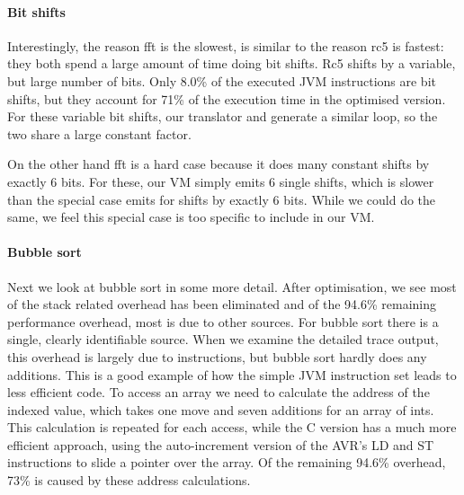 \paragraph{Bit shifts} Interestingly, the reason fft is the slowest, is similar to the reason rc5 is fastest: they both spend a large amount of time doing bit shifts. Rc5 shifts by a variable, but large number of bits. Only 8.0\% of the executed JVM instructions are bit shifts, but they account for 71\% of the execution time in the optimised version. For these variable bit shifts, our translator and  generate a similar loop, so the two share a large constant factor.

On the other hand fft is a hard case because it does many constant shifts by exactly 6 bits. For these, our VM simply emits 6 single shifts, which is slower than the special case  emits for shifts by exactly 6 bits.  While we could do the same, we feel this special case is too specific to include in our VM.

\paragraph{Bubble sort} Next we look at bubble sort in some more detail. After optimisation, we see most of the stack related overhead has been eliminated and of the 94.6\% remaining performance overhead, most is due to other sources. For bubble sort there is a single, clearly identifiable source. When we examine the detailed trace output, this overhead is largely due to  instructions, but bubble sort hardly does any additions. This is a good example of how the simple JVM instruction set leads to less efficient code. To access an array we need to calculate the address of the indexed value, which takes one move and seven additions for an array of ints. This calculation is repeated for each access, while the C version has a much more efficient approach, using the auto-increment version of the AVR's LD and ST instructions to slide a pointer over the array. Of the remaining 94.6\% overhead, 73\% is caused by these address calculations.


